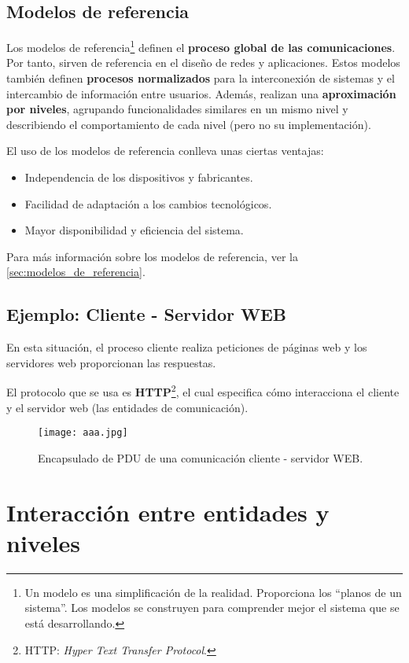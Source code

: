 \documentclass[a4paper]{book}
\numberwithin{figure}{chapter}
\numberwithin{equation}{subsection}
\begin{document}
\subsection{Modelos de referencia}

Los modelos de referencia\footnote{Un modelo es una simplificación de la realidad. Proporciona los ``planos de un sistema''. Los modelos se construyen para comprender mejor el sistema que se está desarrollando.} definen el \textbf{proceso global de las comunicaciones}. Por tanto, sirven de referencia en el diseño de redes y aplicaciones. Estos modelos también definen \textbf{procesos normalizados} para la interconexión de sistemas y el intercambio de información entre usuarios. Además, realizan una \textbf{aproximación por niveles}, agrupando funcionalidades similares en un mismo nivel y describiendo el comportamiento de cada nivel (pero no su implementación).

El uso de los modelos de referencia conlleva unas ciertas ventajas:
\begin{itemize}
  \item Independencia de los dispositivos y fabricantes.
  \item Facilidad de adaptación a los cambios tecnológicos.
  \item Mayor disponibilidad y eficiencia del sistema.
\end{itemize}

Para más información sobre los modelos de referencia, ver la \autoref{sec:modelos_de_referencia}.

\subsection{Ejemplo: Cliente - Servidor WEB}
En esta situación, el proceso cliente realiza peticiones de páginas web y los servidores web proporcionan las respuestas.

El protocolo que se usa es \textbf{HTTP}\footnote{HTTP: \textsl{Hyper Text Transfer Protocol}.}, el cual especifica cómo interacciona el cliente y el servidor web (las entidades de comunicación).

\begin{figure}[ht!]
  \centering
  \texttt{[image: aaa.jpg]}
  \caption{Encapsulado de PDU de una comunicación cliente - servidor WEB.}
\end{figure}


\newpage
\section{Interacción entre entidades y niveles}
\end{document}
